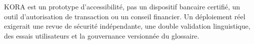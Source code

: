 \begin{warningbox}
KORA est un prototype d’accessibilité, pas un dispositif bancaire certifié,
un outil d’autorisation de transaction ou un conseil financier. Un déploiement
réel exigerait une revue de sécurité indépendante, une double validation
linguistique, des essais utilisateurs et la gouvernance versionnée du
glossaire.
\end{warningbox}
